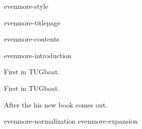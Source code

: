 \environment evenmore-style

\dontcomplain

\startdocument

    \component evenmore-titlepage

    \startfrontmatter
        \component evenmore-contents
    \stopfrontmatter

    \startbodymatter

        \component evenmore-introduction

        \startchapter[title={\TEX\ and Pi}]
            First in TUGboat.
        \stopchapter

        \startchapter[title={Modern Type 3 fonts}]
            First in TUGboat.
        \stopchapter

        \startchapter[title={ThreeSix, Don Knuths first colorfont?}]
            After the his new book comes out.
        \stopchapter

        \component evenmore-normalization
        \component evenmore-expansion

    \stopbodymatter

\stopdocument
